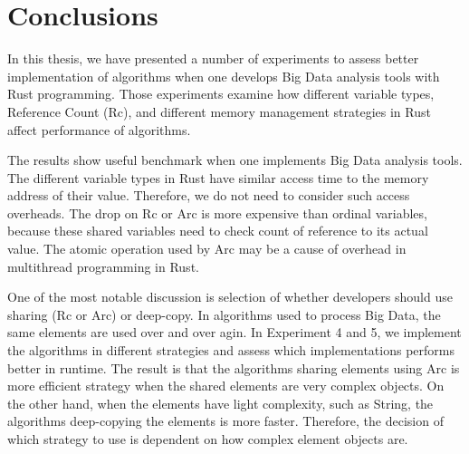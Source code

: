 \chapter{Conclusions}
\label{chapter:Conclusions}
\thispagestyle{myheadings}

\graphicspath{{3_Conclusion/Figures/}}

In this thesis, we have presented a number of experiments to assess better implementation of algorithms 
when one develops Big Data analysis tools with Rust programming. 
Those experiments examine how different variable types, Reference Count (Rc), and different memory management strategies in Rust affect performance of algorithms.

The results show useful benchmark when one implements Big Data analysis tools.
The different variable types in Rust have similar access time to the memory address of their value. 
Therefore, we do not need to consider such access overheads. 
The drop on Rc or Arc is more expensive than ordinal variables, 
because these shared variables need to check count of reference to its actual value. 
The atomic operation used by Arc may be a cause of overhead in multithread programming in Rust. 

One of the most notable discussion is selection of whether developers should use sharing (Rc or Arc) or deep-copy. 
In algorithms used to process Big Data, the same elements are used over and over agin. 
In Experiment 4 and 5, we implement the algorithms in different strategies and assess which implementations performs better in runtime.
The result is that the algorithms sharing elements using Arc is more efficient strategy when the shared elements are very complex objects. 
On the other hand, when the elements have light complexity, such as String, the algorithms deep-copying the elements is more faster.
Therefore, the decision of which strategy to use is dependent on how complex element objects are.

